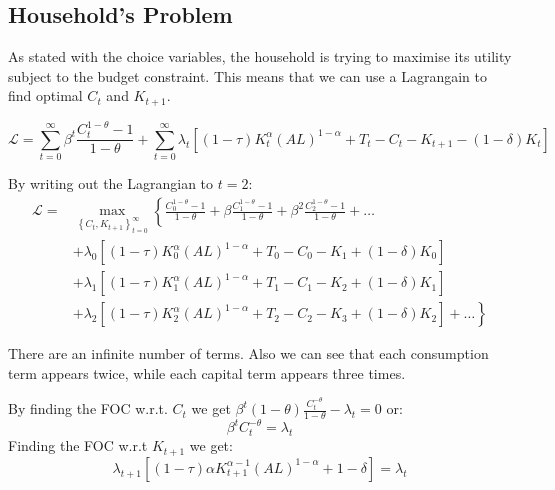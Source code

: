 \documentclass[11pt]{article}
\begin{document}
\subsection{Household's Problem}

As stated with the choice variables, the household is trying to maximise its utility subject to the budget constraint. This means that we can use a Lagrangain to find optimal $C_t$ and $K_{t+1}$.

\begin{shaded}
    \begin{equation}
\label{lagrange}
    \mathcal{L} = \sum_{t=0}^\infty \beta^t \dfrac{C_t^{1-\theta}-1}{1-\theta} + \sum_{t=0}^\infty \lambda_t \left[ (1-\tau)K_{t}^{\alpha}(AL)^{1-\alpha} + T_t - C_t - K_{t+1} - (1-\delta)K_t\right]
\end{equation}
\end{shaded}


By writing out the Lagrangian to $t=2$:
\begin{equation}
\begin{aligned}
\mathcal{L}= & \max _{\left\{C_t, K_{t+1}\right\}_{t=0}^{\infty}}\left\{\frac{C_0^{1-\theta}-1}{1-\theta}+\beta \frac{C_1^{1-\theta}-1}{1-\theta}+\beta^2 \frac{C_2^{1-\theta}-1}{1-\theta}+\ldots\right. \\
& +\lambda_0\left[(1-\tau) K_0^\alpha(A L)^{1-\alpha}+T_0-C_0-K_1+(1-\delta) K_0\right] \\
& +\lambda_1\left[(1-\tau) K_1^\alpha(A L)^{1-\alpha}+T_1-C_1-K_2+(1-\delta) K_1\right] \\
& \left.+\lambda_2\left[(1-\tau) K_2^\alpha(A L)^{1-\alpha}+T_2-C_2-K_3+(1-\delta) K_2\right]+\ldots\right\}
\end{aligned}
\end{equation}

\begin{note}
    There are an infinite number of terms. Also we can see that each consumption term appears twice, while each capital term appears three times.
\end{note}

\begin{shaded}
    By finding the FOC w.r.t. $C_t$ we get $\beta^t (1-\theta)\frac{C_t^{-\theta}}{1-\theta} -\lambda_t= 0$ or:
    \begin{equation}
    \label{foc ct}
        \beta^t C_t ^{-\theta} = \lambda_t
    \end{equation}
Finding the FOC w.r.t $K_{t+1}$ we get:
\begin{equation}
\label{foc kt1}
    \lambda_{t+1}\left[(1-\tau)\alpha K_{t+1}^{\alpha-1}(AL)^{1-\alpha} + 1-\delta \right] = \lambda_t
\end{equation}
\end{shaded}
\end{document}
